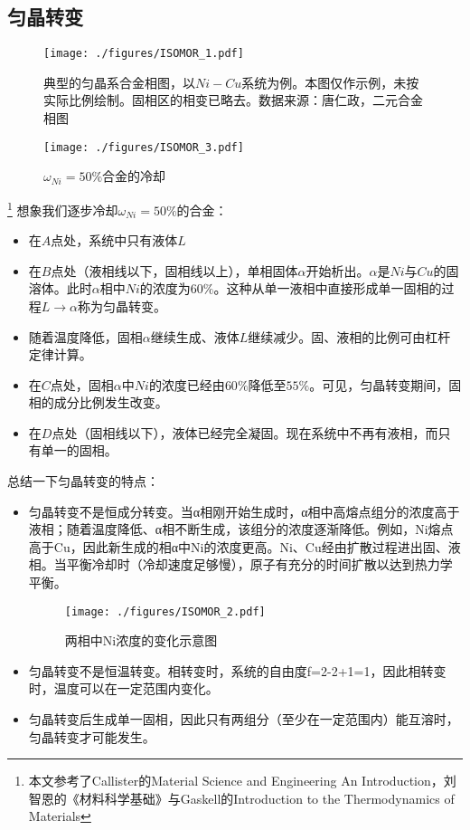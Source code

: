 

\subsection{匀晶转变}

\begin{figure}[ht]
\centering
\texttt{[image: ./figures/ISOMOR\_1.pdf]}
\caption{典型的匀晶系合金相图，以$Ni-Cu$系统为例。本图仅作示例，未按实际比例绘制。固相区的相变已略去。数据来源：唐仁政，二元合金相图} \label{ISOMOR_fig1}
\end{figure}

\begin{figure}[ht]
\centering
\texttt{[image: ./figures/ISOMOR\_3.pdf]}
\caption{$\omega_{Ni}=50\%$合金的冷却} \label{ISOMOR_fig3}
\end{figure}

\footnote{本文参考了Callister的Material Science and Engineering An Introduction，刘智恩的《材料科学基础》与Gaskell的Introduction to the Thermodynamics of Materials}
想象我们逐步冷却$\omega_{Ni}=50\%$的合金：
\begin{itemize}
\item 在$A$点处，系统中只有液体$L$
\item 在$B$点处（液相线以下，固相线以上），单相固体$\alpha$开始析出。$\alpha$是$Ni$与$Cu$的固溶体。此时$\alpha$相中$Ni$的浓度为$60\%$。这种从单一液相中直接形成单一固相的过程$L\to\alpha$称为匀晶转变。
\item 随着温度降低，固相$\alpha$继续生成、液体$L$继续减少。固、液相的比例可由杠杆定律计算。%
\item 在$C$点处，固相$\alpha$中$Ni$的浓度已经由$60\%$降低至$55\%$。可见，匀晶转变期间，固相的成分比例发生改变。
\item 在$D$点处（固相线以下），液体已经完全凝固。现在系统中不再有液相，而只有单一的固相。

\end{itemize}

总结一下匀晶转变的特点：
\begin{itemize}
\item 匀晶转变不是恒成分转变。当α相刚开始生成时，α相中高熔点组分的浓度高于液相；随着温度降低、α相不断生成，该组分的浓度逐渐降低。例如，Ni熔点高于Cu，因此新生成的相α中Ni的浓度更高。Ni、Cu经由扩散过程进出固、液相。当平衡冷却时（冷却速度足够慢），原子有充分的时间扩散以达到热力学平衡。

\begin{figure}[ht]
\centering
\texttt{[image: ./figures/ISOMOR\_2.pdf]}
\caption{两相中Ni浓度的变化示意图} \label{ISOMOR_fig2}
\end{figure}

\item 匀晶转变不是恒温转变。相转变时，系统的自由度f=2-2+1=1，因此相转变时，温度可以在一定范围内变化。
\item 匀晶转变后生成单一固相，因此只有两组分（至少在一定范围内）能互溶时，匀晶转变才可能发生。
\end{itemize}

